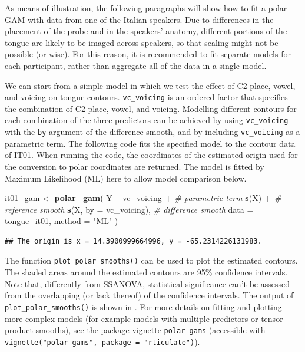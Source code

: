 \documentclass[12pt,]{article}
\newenvironment{Shaded}{\begin{snugshade}}{\end{snugshade}}
\newcommand{\CommentTok}[1]{\textcolor[rgb]{0.56,0.35,0.01}{\textit{#1}}}
\newcommand{\DataTypeTok}[1]{\textcolor[rgb]{0.13,0.29,0.53}{#1}}
\newcommand{\KeywordTok}[1]{\textcolor[rgb]{0.13,0.29,0.53}{\textbf{#1}}}
\newcommand{\NormalTok}[1]{#1}
\newcommand{\OperatorTok}[1]{\textcolor[rgb]{0.81,0.36,0.00}{\textbf{#1}}}
\newcommand{\StringTok}[1]{\textcolor[rgb]{0.31,0.60,0.02}{#1}}
\begin{document}
As means of illustration, the following paragraphs will show how to fit
a polar GAM with data from one of the Italian speakers. Due to
differences in the placement of the probe and in the speakers' anatomy,
different portions of the tongue are likely to be imaged across
speakers, so that scaling might not be possible (or wise). For this
reason, it is recommended to fit separate models for each participant,
rather than aggregate all of the data in a single model.

We can start from a simple model in which we test the effect of C2
place, vowel, and voicing on tongue contours. \texttt{vc\_voicing} is an
ordered factor that specifies the combination of C2 place, vowel, and
voicing. Modelling different contours for each combination of the three
predictors can be achieved by using \texttt{vc\_voicing} with the
\texttt{by} argument of the difference smooth, and by including
\texttt{vc\_voicing} as a parametric term. The following code fits the
specified model to the contour data of IT01. When running the code, the
coordinates of the estimated origin used for the conversion to polar
coordinates are returned. The model is fitted by Maximum Likelihood (ML)
here to allow model comparison below.

\begin{Shaded}
\begin{Highlighting}[]
\NormalTok{it01_gam <-}\StringTok{ }\KeywordTok{polar_gam}\NormalTok{(}
\NormalTok{  Y }\OperatorTok{~}
\StringTok{    }\NormalTok{vc_voicing }\OperatorTok{+}\StringTok{            }\CommentTok{# parametric term}
\StringTok{    }\KeywordTok{s}\NormalTok{(X) }\OperatorTok{+}\StringTok{                  }\CommentTok{# reference smooth}
\StringTok{    }\KeywordTok{s}\NormalTok{(X, }\DataTypeTok{by =}\NormalTok{ vc_voicing),  }\CommentTok{# difference smooth}
  \DataTypeTok{data =}\NormalTok{ tongue_it01,}
  \DataTypeTok{method =} \StringTok{"ML"}
\NormalTok{)}
\end{Highlighting}
\end{Shaded}

\begin{verbatim}
## The origin is x = 14.3900999664996, y = -65.2314226131983.
\end{verbatim}

The function \texttt{plot\_polar\_smooths()} can be used to plot the
estimated contours. The shaded areas around the estimated contours are
95\% confidence intervals. Note that, differently from SSANOVA,
statistical significance can't be assessed from the overlapping (or lack
thereof) of the confidence intervals. The output of
\texttt{plot\_polar\_smooths()} is shown in . For
more details on fitting and plotting more complex models (for example
models with multiple predictors or tensor product smooths), see the
package vignette \texttt{polar-gams} (accessible with
\texttt{vignette("polar-gams",\ package\ =\ "rticulate")}).
\end{document}

